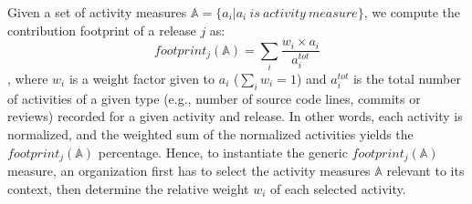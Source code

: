 
Given a set of activity measures $\mathbb{A}=\{a_i | a_i\ is\ activity\ measure\}$, we compute the contribution footprint of a release $j$ as: $$footprint_j(\mathbb{A})=\sum_{i} \frac{w_i \times a_i}{a_i^{tot}}$$, where $w_i$ is a weight factor given to $a_i$ ($\sum_i w_i = 1$) and $a_i^{tot}$ is the total number of activities of a given type (e.g., number of source code lines, commits or reviews) recorded for a given activity and release. In other words, each activity is normalized, and the weighted sum of the normalized activities yields the $footprint_j(\mathbb{A})$ percentage. Hence, to instantiate the generic $footprint_j(\mathbb{A})$ measure, an organization first has to select the activity measures $\mathbb{A}$ relevant to its context, then determine the relative weight $w_i$ of each selected activity.




